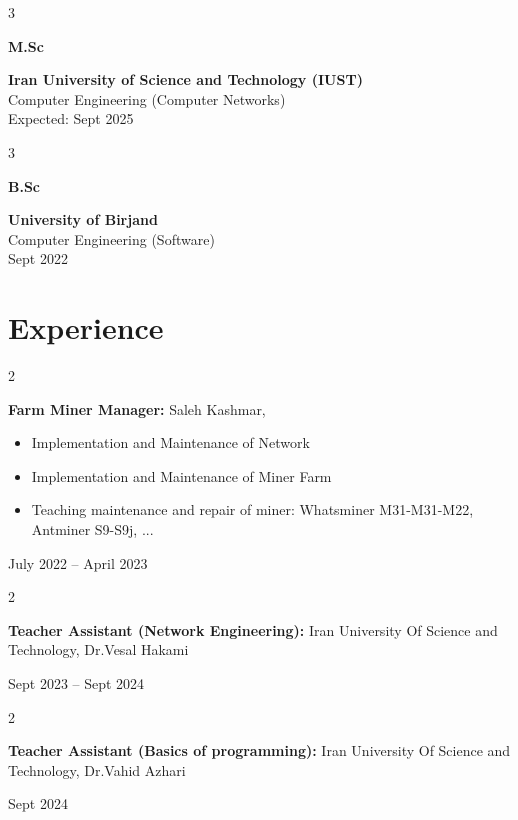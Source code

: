\documentclass[10pt, letterpaper]{article}
\newenvironment{highlights}{
	\begin{itemize}[
		topsep=0.10 cm,
		parsep=0.10 cm,
		partopsep=0pt,
		itemsep=0pt,
		leftmargin=0.4 cm + 10pt
		]
	}{
	\end{itemize}
} %
\newenvironment{twocolentry}[2][]{
	\onecolentry
	\def\secondColumn{#2}
	\setcolumnwidth{\fill, 4.5 cm}
	\begin{paracol}{2}
	}{
		\switchcolumn \raggedleft \secondColumn
	\end{paracol}
	\endonecolentry
} %
\newenvironment{threecolentry}[3][]{
	\onecolentry
	\def\thirdColumn{#3}
	\setcolumnwidth{1 cm, \fill, 4.5 cm}
	\begin{paracol}{3}
		{\raggedright #2} \switchcolumn
	}{
		\switchcolumn \raggedleft \thirdColumn
	\end{paracol}
	\endonecolentry
} %
\begin{document}
	\begin{threecolentry}{\textbf{M.Sc}}{Expected: Sept 2025}
		
	\textbf{Iran University of Science and Technology (IUST)}\\
	Computer Engineering (Computer Networks) \\

	\end{threecolentry}

	\begin{threecolentry}{\textbf{B.Sc}}{Sept 2022}
		\textbf{University of Birjand} \\
		Computer Engineering (Software)\\
	
	\end{threecolentry}
	
\section{Experience}
	\begin{twocolentry}{July 2022 – April 2023}
		
		\textbf{Farm Miner Manager:} Saleh Kashmar, 
		\begin{highlights}
			\item Implementation and Maintenance of Network
			
			\item Implementation and Maintenance of Miner Farm 
			
			\item Teaching maintenance and repair of miner: Whatsminer M31-M31-M22, Antminer S9-S9j, ...
			
			
		\end{highlights}
	\end{twocolentry}

	\vspace{0.2 cm}	
	
	\begin{twocolentry}{Sept 2023 – Sept 2024}
		\textbf{Teacher Assistant (Network Engineering):} Iran University Of Science and
		Technology, Dr.Vesal Hakami
	\end{twocolentry}
	
	\vspace{0.2 cm}	
	
	\begin{twocolentry}{Sept 2024}
		\textbf{Teacher Assistant (Basics of programming):} Iran University Of Science and
		Technology, Dr.Vahid Azhari
	\end{twocolentry}
	
\end{document}
